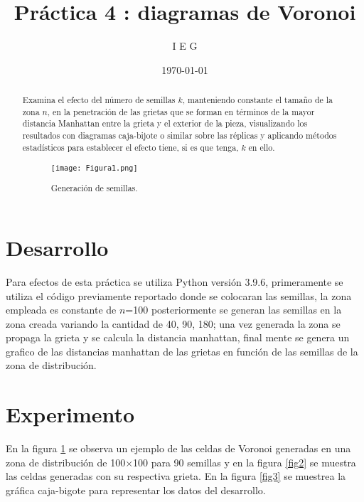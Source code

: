 \documentclass{article}
\author{I E G} %
\title{Práctica 4 : diagramas de Voronoi} %
\date{\today}
\begin{document}

\maketitle %

\begin{abstract} %

Examina el efecto del número de semillas $k$, manteniendo \cite{elis4} constante el tamaño de la zona $n$, en la penetración de las grietas que se forman en términos de la mayor distancia Manhattan entre la grieta y el exterior de la pieza, visualizando los resultados con diagramas caja-bijote o similar sobre las réplicas y aplicando métodos estadísticos para establecer el efecto tiene, si es que tenga, $k$ en ello.



\begin{figure} [h!]%
    \centering
    \texttt{[image: Figura1.png]} %
    \caption{Generación de semillas.}
    \label{fig1}
\end{figure}

\end{abstract}


\section{Desarrollo}

Para efectos de esta práctica se utiliza Python versión 3.9.6, primeramente se utiliza el código previamente reportado \cite{elis4} donde se colocaran las semillas, la zona empleada es constante de $n$=100 posteriormente se generan las semillas en la zona creada variando \cite{cae4} la cantidad de 40, 90, 180; una vez generada la zona se propaga la grieta y se calcula la distancia manhattan, final mente se genera un grafico de las distancias manhattan de las grietas en función de las semillas de la zona de distribución. 

\section{Experimento}
En la figura \ref{fig1} se observa un ejemplo de las celdas de Voronoi generadas en una zona de distribución de 100×100 para 90 semillas y en la figura \ref{fig2} se muestra las celdas generadas con su respectiva grieta. En la figura \ref{fig3} se muestrea la gráfica caja-bigote para representar los datos del desarrollo.
\end{document}
